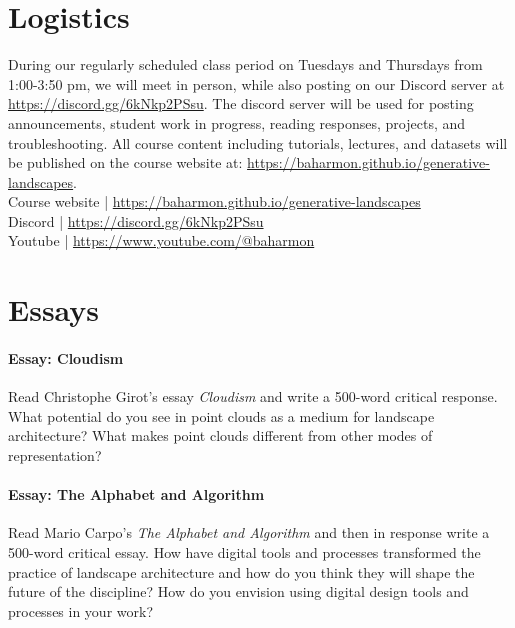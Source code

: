 \documentclass[11pt,article,oneside]{memoir}
\begin{document}
\clearpage

\section{Logistics}

During our regularly scheduled class period
on Tuesdays and Thursdays from 1:00-3:50 pm,
we will meet in person, while also posting
on our Discord server at \url{https://discord.gg/6kNkp2PSsu}.
The discord server will be used for posting
announcements, student work in progress, 
reading responses, projects, and troubleshooting. 
All course content including tutorials, lectures, and datasets
will be published on the course website at:
\url{https://baharmon.github.io/generative-landscapes}.\\

\noindent
Course website | \url{https://baharmon.github.io/generative-landscapes}\\
Discord | \url{https://discord.gg/6kNkp2PSsu}\\
Youtube | \url{https://www.youtube.com/@baharmon}\\

\section{Essays}

\paragraph{Essay: Cloudism}
Read Christophe Girot's essay \emph{Cloudism}
and write a 500-word critical response. 
What potential do you see in point clouds
as a medium for landscape architecture?
What makes point clouds different
from other modes of representation?
\nocite{*} \printbibliography[keyword=a, heading=none]

\paragraph{Essay: The Alphabet and Algorithm}
Read Mario Carpo's \emph{The Alphabet and Algorithm}
and then in response write a 500-word critical essay.
How have digital tools and processes transformed 
the practice of landscape architecture
and how do you think they will shape 
the future of the discipline?
How do you envision using
digital design tools and processes in your work?
\end{document}
